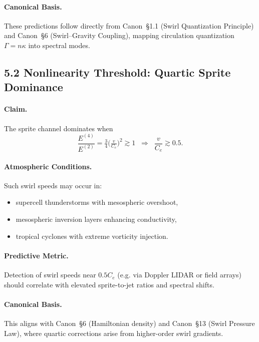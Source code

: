 \documentclass[11pt]{article}
\newcommand{\Ce}{C_{e}}
\begin{document}
    \paragraph{Canonical Basis.}
        These predictions follow directly from Canon~§1.1 (Swirl
        Quantization Principle) and Canon~§6 (Swirl–Gravity Coupling),
        mapping circulation quantization $\Gamma=n\kappa$ into spectral modes.

\subsection*{5.2 Nonlinearity Threshold: Quartic Sprite Dominance}

\paragraph{Claim.}
    The sprite channel dominates when
    \begin{equation}
    \frac{E^{(4)}}{E^{(2)}} = \tfrac{3}{4}\Big(\tfrac{v}{\Ce}\Big)^2 \gtrsim 1
    \;\;\Rightarrow\;\;
    \frac{v}{\Ce} \gtrsim 0.5.
    \end{equation}

\paragraph{Atmospheric Conditions.}
    Such swirl speeds may occur in:
    \begin{itemize}
    \item supercell thunderstorms with mesospheric overshoot,
    \item mesospheric inversion layers enhancing conductivity,
    \item tropical cyclones with extreme vorticity injection.
    \end{itemize}

\paragraph{Predictive Metric.}
    Detection of swirl speeds near $0.5\Ce$ (e.g. via Doppler LIDAR
    or field arrays) should correlate with elevated sprite-to-jet
    ratios and spectral shifts.

\paragraph{Canonical Basis.}
    This aligns with Canon~§6 (Hamiltonian density) and
    Canon~§13 (Swirl Pressure Law), where quartic corrections
    arise from higher-order swirl gradients.
\end{document}
